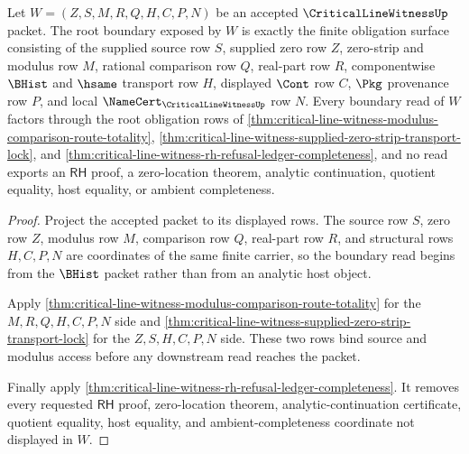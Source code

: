 \begin{theorem}
\label{thm:critical-line-witness-boundary-obligation-surface}
Let $W=(Z,S,M,R,Q,H,C,P,N)$ be an accepted $\CriticalLineWitnessUp$ packet. The root boundary exposed by $W$ is exactly the finite obligation surface consisting of the supplied source row $S$, supplied zero row $Z$, zero-strip and modulus row $M$, rational comparison row $Q$, real-part row $R$, componentwise $\BHist$ and $\hsame$ transport row $H$, displayed $\Cont$ row $C$, $\Pkg$ provenance row $P$, and local $\NameCert_{\CriticalLineWitnessUp}$ row $N$. Every boundary read of $W$ factors through the root obligation rows of \autoref{thm:critical-line-witness-modulus-comparison-route-totality}, \autoref{thm:critical-line-witness-supplied-zero-strip-transport-lock}, and \autoref{thm:critical-line-witness-rh-refusal-ledger-completeness}, and no read exports an $\mathsf{RH}$ proof, a zero-location theorem, analytic continuation, quotient equality, host equality, or ambient completeness.
\end{theorem}
\begin{proof}
Project the accepted packet to its displayed rows. The source row $S$, zero row $Z$, modulus row $M$, comparison row $Q$, real-part row $R$, and structural rows $H,C,P,N$ are coordinates of the same finite carrier, so the boundary read begins from the $\BHist$ packet rather than from an analytic host object.

Apply \autoref{thm:critical-line-witness-modulus-comparison-route-totality} for the $M,R,Q,H,C,P,N$ side and \autoref{thm:critical-line-witness-supplied-zero-strip-transport-lock} for the $Z,S,H,C,P,N$ side. These two rows bind source and modulus access before any downstream read reaches the packet.

Finally apply \autoref{thm:critical-line-witness-rh-refusal-ledger-completeness}. It removes every requested $\mathsf{RH}$ proof, zero-location theorem, analytic-continuation certificate, quotient equality, host equality, and ambient-completeness coordinate not displayed in $W$.
\end{proof}

